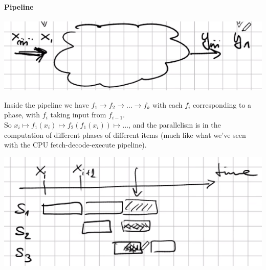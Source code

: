 \documentclass[10pt]{report}
\begin{document}
\paragraph{Pipeline}
\begin{center}
	\includegraphics[scale=0.5]{3.png}
\end{center}
Inside the pipeline we have $f_1\rightarrow f_2\rightarrow\ldots\rightarrow f_k$ with each $f_i$ corresponding to a phase, with $f_i$ taking input from $f_{i-1}$.\\
So $x_i\mapsto f_1(x_i)\mapsto f_2(f_1(x_i))\mapsto \ldots$, and the parallelism is in the computation of different phases of different items (much like what we've seen with the CPU fetch-decode-execute pipeline).
\begin{center}
	\includegraphics[scale=0.5]{4.png}
\end{center}
\end{document}
